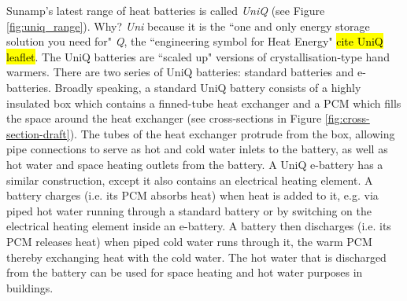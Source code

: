Sunamp's latest range of heat batteries is called \emph{UniQ} (see Figure \ref{fig:uniq_range}).
Why?
\emph{Uni} because it is the ``one and only energy storage solution you need for" \emph{Q}, the ``engineering symbol for Heat Energy" \hl{cite UniQ leaflet}.
The UniQ batteries are ``scaled up" versions of crystallisation-type hand warmers.
There are two series of UniQ batteries: standard batteries and e-batteries.
Broadly speaking, a standard UniQ battery consists of a highly insulated box which contains a finned-tube heat exchanger and a PCM which fills the space around the heat exchanger (see cross-sections in Figure \ref{fig:cross-section-draft}).
The tubes of the heat exchanger protrude from the box, allowing pipe connections to serve as hot and cold water inlets to the battery, as well as hot water and space heating outlets from the battery.
A UniQ e-battery has a similar construction, except it also contains an electrical heating element.
A battery charges (i.e. its PCM absorbs heat) when heat is added to it, e.g. via piped hot water running through a standard battery or by switching on the electrical heating element inside an e-battery.
A battery then discharges (i.e. its PCM releases heat) when piped cold water runs through it, the warm PCM thereby exchanging heat with the cold water.
The hot water that is discharged from the battery can be used for space heating and hot water purposes in buildings.


